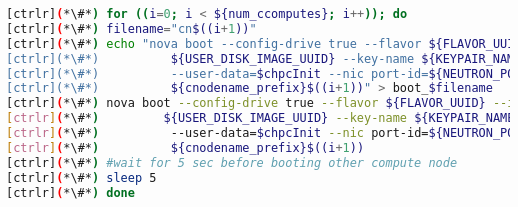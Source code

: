 \begin{lstlisting}[language=bash,keywords={}]
[ctrlr](*\#*) for ((i=0; i < ${num_ccomputes}; i++)); do
[ctrlr](*\#*) filename="cn$((i+1))"
[ctrlr](*\#*) echo "nova boot --config-drive true --flavor ${FLAVOR_UUID} --image \
[ctrlr](*\#*)          ${USER_DISK_IMAGE_UUID} --key-name ${KEYPAIR_NAME} --meta role=webservers \
[ctrlr](*\#*)          --user-data=$chpcInit --nic port-id=${NEUTRON_PORT_ID_CC[$i]} \
[ctrlr](*\#*)          ${cnodename_prefix}$((i+1))" > boot_$filename
[ctrlr](*\#*) nova boot --config-drive true --flavor ${FLAVOR_UUID} --image \
[ctrlr](*\#*)         ${USER_DISK_IMAGE_UUID} --key-name ${KEYPAIR_NAME} --meta role=webservers \
[ctrlr](*\#*)          --user-data=$chpcInit --nic port-id=${NEUTRON_PORT_ID_CC[$i]} \
[ctrlr](*\#*)          ${cnodename_prefix}$((i+1))
[ctrlr](*\#*) #wait for 5 sec before booting other compute node
[ctrlr](*\#*) sleep 5
[ctrlr](*\#*) done
\end{lstlisting}

